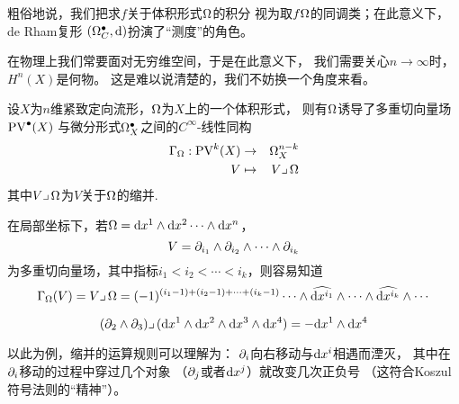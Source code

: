 粗俗地说，我们把求$f$关于体积形式$\Omega$的积分
视为取$f\Omega$的同调类；在此意义下，de Rham复形
$(\Omega_C^{\bullet},\mathrm{d})$扮演了“测度”的角色。




在物理上我们常要面对无穷维空间，于是在此意义下，
我们需要关心$n\to\infty$时，$H^n(X)$是何物。
这是难以说清楚的，我们不妨换一个角度来看。


\begin{definition}
设$X$为$n$维紧致定向流形，$\Omega$为$X$上的一个体积形式，
则有$\Omega$诱导了多重切向量场$\operatorname{PV}^{\bullet}(X)$
与微分形式$\Omega_X^{\bullet}$之间的$C^{\infty}$-线性同构
\begin{eqnarray*}
\Gamma_\Omega:\operatorname{PV}^k(X)&\to&\Omega^{n-k}_X\\
V&\mapsto& V\lrcorner\,\Omega
\end{eqnarray*}
其中$V\lrcorner\,\Omega$为$V$关于$\Omega$的缩并.
\end{definition}


在局部坐标下，若$\Omega=\mathrm{d} x^1\wedge\mathrm{d} x^2\cdots\wedge\mathrm{d} x^n$，
$$V=\partial_{i_1}\wedge\partial_{i_2}\wedge\cdots\wedge\partial_{i_k}$$
为多重切向量场，其中指标$i_1<i_2<\cdots<i_k$，则容易知道
$$
  \Gamma_\Omega(V)=V\lrcorner\,\Omega
= (-1)^{(i_1-1)+(i_2-1)+\cdots+(i_k-1)}
  \cdots\wedge\widehat{\mathrm{d} x^{i_1}}
  \wedge\cdots\wedge\widehat{\mathrm{d} x^{i_k}}\wedge\cdots
$$

\begin{example}
$$(\partial_2\wedge\partial_3)\lrcorner\,(\mathrm{d} x^1\wedge\mathrm{d} x^2\wedge\mathrm{d} x^3\wedge\mathrm{d} x^4)
=-\mathrm{d} x^1\wedge\mathrm{d} x^4$$
\end{example}
以此为例，缩并的运算规则可以理解为：
$\partial_i$向右移动与$\mathrm{d} x^i$相遇而湮灭，
其中在$\partial_i$移动的过程中穿过几个对象
（$\partial_j$或者$\mathrm{d} x^j$）就改变几次正负号
（这符合Koszul符号法则的“精神”）。

